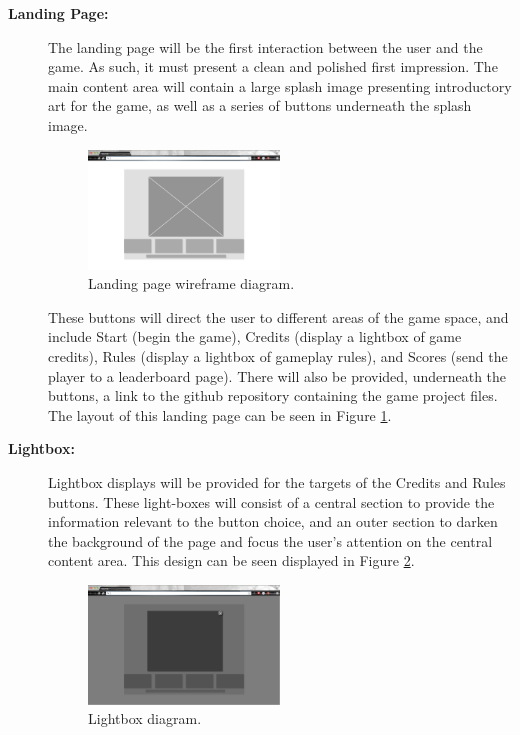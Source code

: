 \documentclass[12pt]{IEEEtran}
\begin{document}
	\begin{description}
	\item[\textbf{Landing Page:}] \hspace{4em} The landing page will be the first interaction between the user and the game. As such, it must present a clean and polished first impression. The main content area will contain a large splash image presenting introductory art for the game, as well as a series of buttons underneath the splash image.
	
	\begin{figure}[h]
		\centering
		\includegraphics[width=0.5\textwidth]{1_IntroPage.jpg}
		\caption{Landing page wireframe diagram. }
		\label{fig:landingpagewireframe}
	\end{figure}
	
	These buttons will direct the user to different areas of the game space, and include Start (begin the game), Credits (display a lightbox of game credits), Rules (display a lightbox of gameplay rules), and Scores (send the player to a leaderboard page). There will also be provided, underneath the buttons, a link to the github repository containing the game project files. The layout of this landing page can be seen in 	Figure \ref{fig:landingpagewireframe}.
	
	\item[\textbf{Lightbox:}] \hspace{2em} Lightbox displays will be provided for the targets of the Credits and Rules buttons. These light-boxes will consist of a central section to provide the information relevant to the button choice, and an outer section to darken the background of the page and focus the user’s attention on the central content area. This design can be seen displayed in Figure \ref{fig:lightbox}. 
	
	\begin{figure}[h]
		\centering
		\includegraphics[width=0.5\textwidth]{2_rulesCreditsScoresLightbox.jpg}
		\caption{Lightbox diagram. }
		\label{fig:lightbox}
	\end{figure}
	

\end{description}
\end{document}

